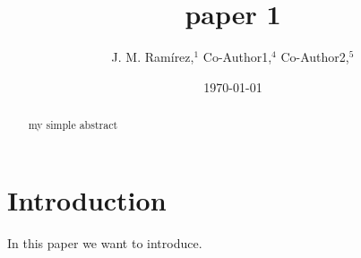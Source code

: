 \documentclass{article}\usepackage{graphicx}
\title{paper 1}
\author{
J. M. Ram{\'i}rez,$^{1}$
Co-Author1,$^{4}$
Co-Author2,$^{5}$
}
\date{\today}
\begin{document}
\maketitle\begin{abstract}

my simple abstract

\end{abstract}\section{Introduction}
In this paper we want to introduce.
\end{document}
